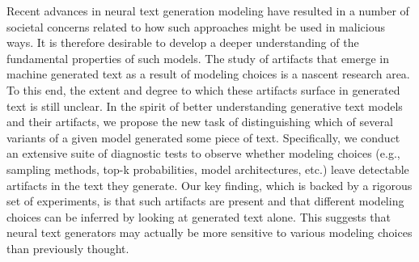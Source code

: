 Recent advances in neural text generation modeling have resulted in a number of societal concerns related to how such approaches might be used in malicious ways. It is therefore desirable to develop a deeper understanding of the fundamental properties of such models. The study of artifacts that emerge in machine generated text as a result of modeling choices is a nascent research area. To this end, the extent and degree to which these artifacts surface in generated text is still unclear. In the spirit of better understanding generative text models and their artifacts, we propose the new task of distinguishing which of several variants of a given model generated some piece of text. Specifically, we conduct an extensive suite of diagnostic tests to observe whether modeling choices (e.g., sampling methods, top-k probabilities, model architectures, etc.) leave detectable artifacts in the text they generate. Our key finding, which is backed by a rigorous set of experiments, is that such artifacts are present and that different modeling choices can be inferred by looking at generated text alone. This suggests that neural text generators may actually be more sensitive to various modeling choices than previously thought.
